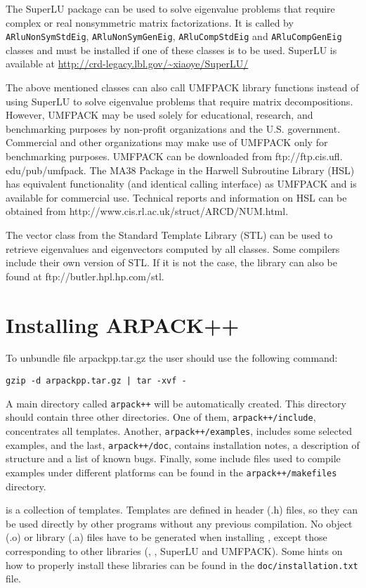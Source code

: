 The SuperLU  package can be used to solve eigenvalue problems that require complex or real nonsymmetric matrix factorizations. It is called by \texttt{ARluNonSymStdEig}, \texttt{ARluNonSymGenEig}, \texttt{ARluCompStdEig} and \texttt{ARluCompGenEig} classes and must be installed if one of these classes is to be used. SuperLU is available at \url{http://crd-legacy.lbl.gov/\~xiaoye/SuperLU/}

The above mentioned classes can also call UMFPACK library functions instead of using SuperLU to solve eigenvalue problems that require matrix decompositions. However, UMFPACK may be used solely for educational, research, and benchmarking purposes by non-profit organizations and the U.S. government. Commercial and other organizations may make use of UMFPACK only for benchmarking purposes. UMFPACK can be downloaded from ftp://ftp.cis.ufl. edu/pub/umfpack. The MA38 Package in the Harwell Subroutine Library (HSL) has equivalent functionality (and identical calling interface) as UMFPACK and is available for commercial use. Technical reports and information on HSL can be obtained from http://www.cis.rl.ac.uk/struct/ARCD/NUM.html.

The vector class from the Standard Template Library (STL) can be used to retrieve eigenvalues and eigenvectors computed by all \ARPP{} classes. Some compilers include their own version of STL. If it is not the case, the library can also be found at ftp://butler.hpl.hp.com/stl.

\section{Installing ARPACK++}

To unbundle file arpackpp.tar.gz the user should use the following command:
\begin{verbatim}
gzip -d arpackpp.tar.gz | tar -xvf -
\end{verbatim}
A main directory called \texttt{arpack++} will be automatically created. This directory should contain three other directories. One of them, \texttt{arpack++/include}, concentrates all \ARPP{} templates. Another, \texttt{arpack++/examples}, includes some selected examples, and the last, \texttt{arpack++/doc}, contains installation notes, a description of \ARPP{} structure and a list of known bugs. Finally, some include files used to compile \ARPP{} examples under different platforms can be found in the \texttt{arpack++/makefiles} directory.

\ARPP{} is a collection of templates. Templates are defined in header (.h) files, so they can be used directly by other programs without any previous compilation. No object (.o) or library (.a) files have to be generated when installing \ARPP{}, except those corresponding to other libraries (\ARP{}, \LAP{}, SuperLU and UMFPACK). Some hints on how to properly install these libraries can be found in the \texttt{doc/installation.txt} file.

